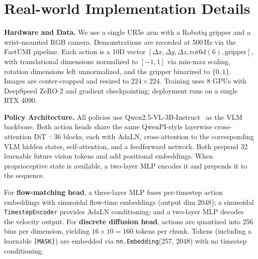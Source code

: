 \documentclass{article}
\begin{document}

\newpage
\section{Real-world Implementation Details}
\label{app: realexp}

\textbf{Hardware and Data.}
We use a single UR5e arm with a Robotiq gripper and a wrist-mounted RGB camera.
Demonstrations are recorded at 500\,Hz via the FastUMI pipeline.
Each action is a 10D vector $[\Delta x, \Delta y, \Delta z, \text{rot6d}(6), \text{gripper}]$, with translational dimensions normalized to $[-1, 1]$ via min-max scaling, rotation dimensions left unnormalized, and the gripper binarized to $\{0, 1\}$.
Images are center-cropped and resized to $224 \times 224$.
Training uses 8 GPUs with DeepSpeed ZeRO-2 and gradient checkpointing; deployment runs on a single RTX 4090.

\textbf{Policy Architecture.}
All policies use Qwen2.5-VL-3B-Instruct~\citep{yang2025qwen3} as the VLM backbone.
Both action heads share the same QwenPI-style layerwise cross-attention DiT~\citep{peebles2023scalable}: 36 blocks, each with AdaLN, cross-attention to the corresponding VLM hidden states, self-attention, and a feedforward network.
Both prepend 32 learnable future vision tokens and add positional embeddings.
When proprioceptive state is available, a two-layer MLP encodes it and prepends it to the sequence.

For \textbf{flow-matching head}, a three-layer MLP fuses per-timestep action embeddings with sinusoidal flow-time embeddings (output dim 2048); a sinusoidal \texttt{TimestepEncoder} provides AdaLN conditioning; and a two-layer MLP decodes the velocity output.
For \textbf{discrete diffusion head}, actions are quantized into 256 bins per dimension, yielding $16 \times 10 = 160$ tokens per chunk.
Tokens (including a learnable \texttt{[MASK]}) are embedded via \texttt{nn.Embedding}(257, 2048) with no timestep conditioning.

\end{document}
